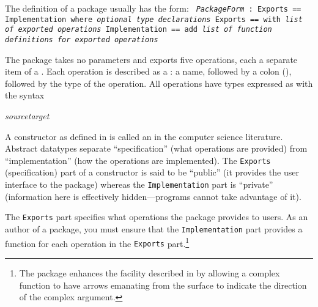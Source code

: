 \beginImportant
The definition of a package usually has the form: \newline
{\tt%
{\it PackageForm} : Exports  ==  Implementation where \newline
\hspace*{.75pc} {\it optional type declarations}\newline
\hspace*{.75pc} Exports  ==   with \newline
\hspace*{2.0pc}   {\it list of exported operations}\newline
\hspace*{.75pc} Implementation == add \newline
\hspace*{2.0pc}   {\it list of function definitions for exported operations}
}
\endImportant

The  package takes no parameters and exports five
operations, each a separate item of a .
Each operation is described as a : a name, followed
by a colon (\spadSyntax{:}), followed by the type of the operation.
All operations have types expressed as  with
the syntax
\begin{center}
{\it
source\quad{\tt ->}\quad target
}
\end{center}


A constructor as defined in \Language{} is called an  in the computer science literature.
Abstract datatypes separate ``specification'' (what operations are
provided) from ``implementation'' (how the operations are implemented).
The {\tt Exports} (specification) part of a constructor is said to be ``public'' (it
provides the user interface to the package) whereas the {\tt Implementation}
part is ``private'' (information here is effectively hidden---programs
cannot take advantage of it).

The {\tt Exports} part specifies what operations the package provides to users.
As an author of a package, you must ensure that
the {\tt Implementation} part provides a function for each
operation in the {\tt Exports} part.\footnote{The 
package enhances the facility
described in   by allowing a
complex function to have
arrows emanating from the surface to indicate the direction of the
complex argument.}

